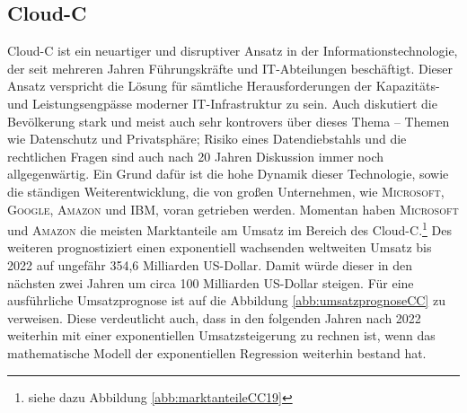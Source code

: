 \subsection{\ac{Cloud-C}}
\ac{Cloud-C} ist ein neuartiger und disruptiver Ansatz in der Informationstechnologie, der seit mehreren Jahren Führungskräfte und IT-Abteilungen beschäftigt. Dieser Ansatz verspricht die Lösung für sämtliche Herausforderungen der Kapazitäts- und Leistungsengpässe moderner IT-Infrastruktur zu sein.\autocite[vgl.][S.4]{reinheimer_cloud_2018} Auch diskutiert die Bevölkerung stark und meist auch sehr kontrovers über dieses Thema -- Themen wie Datenschutz und Privatsphäre; Risiko eines Datendiebstahls und die rechtlichen Fragen sind auch nach 20 Jahren Diskussion immer noch allgegenwärtig. Ein Grund dafür ist die hohe Dynamik dieser Technologie, sowie die ständigen Weiterentwicklung, die von großen Unternehmen, wie \textsc{Microsoft}, \textsc{Google}, \textsc{Amazon} und \textsc{IBM}, voran getrieben werden. Momentan haben \textsc{Microsoft} und \textsc{Amazon} die meisten Marktanteile am Umsatz im Bereich des \ac{Cloud-C}.\footnote{siehe dazu Abbildung \vref{abb:marktanteileCC19}} Des weiteren prognostiziert \cite{gartner_cloud_2019} einen exponentiell wachsenden weltweiten Umsatz bis 2022 auf ungefähr 354,6 Milliarden US-Dollar. Damit würde dieser in den nächsten zwei Jahren um circa 100 Milliarden US-Dollar steigen. Für eine ausführliche Umsatzprognose ist auf die Abbildung \vref{abb:umsatzprognoseCC} zu verweisen. Diese verdeutlicht auch, dass in den folgenden Jahren nach 2022 weiterhin mit einer exponentiellen Umsatzsteigerung zu rechnen ist, wenn das mathematische Modell der exponentiellen Regression weiterhin bestand hat. \par
